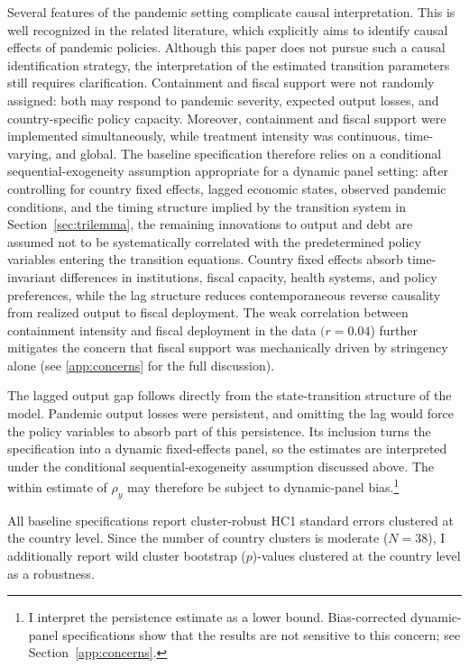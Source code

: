 \documentclass[12pt, a4paper]{article}
\begin{document}
Several features of the pandemic setting complicate causal interpretation. This is well recognized in the related literature, which explicitly aims to identify causal effects of pandemic policies. Although this paper does not pursue such a causal identification strategy, the interpretation of the estimated transition parameters still requires clarification. Containment and fiscal support were not randomly assigned: both may respond to pandemic severity, expected output losses, and country-specific policy capacity. Moreover, containment and fiscal support were implemented simultaneously, while treatment intensity was continuous, time-varying, and global.
The baseline specification therefore relies on a conditional sequential-exogeneity assumption appropriate for a dynamic panel setting: after controlling for country fixed effects, lagged economic states, observed pandemic conditions, and the timing structure implied by the transition system in Section~\ref{sec:trilemma}, the remaining innovations to output and debt are assumed not to be systematically correlated with the predetermined policy variables entering the transition equations. Country fixed effects absorb time-invariant differences in institutions, fiscal capacity, health systems, and policy preferences, while the lag structure reduces contemporaneous reverse causality from realized output to fiscal deployment. The weak correlation between containment intensity and fiscal deployment in the data \((r=0.04\)) further mitigates the concern that fiscal support was mechanically driven by stringency alone (see \ref{app:concerns} for the full discussion).

The lagged output gap follows directly from the state-transition structure of the model. Pandemic output losses were persistent, and omitting the lag would force the policy variables to absorb part of this persistence. Its inclusion turns the specification into a dynamic fixed-effects panel, so the estimates are interpreted under the conditional sequential-exogeneity assumption discussed above. The within estimate of $\rho_y$ may therefore be subject to dynamic-panel bias.\footnote{I interpret the persistence estimate as a lower bound. Bias-corrected dynamic-panel specifications show that the results are not sensitive to this concern; see Section~\ref{app:concerns}.}

All baseline specifications report cluster-robust HC1 standard errors clustered at the country level. Since the number of country clusters is moderate (\(N=38\)), I additionally report wild cluster bootstrap (\(p\))-values clustered at the country level as a robustness.
\end{document}
